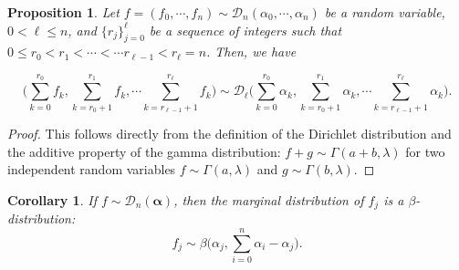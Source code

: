 \documentclass[12pt, a4paper]{amsart}
\theoremstyle{plain}
\newtheorem{prop}[thm]{Proposition}
\newtheorem{cor}[thm]{Corollary}
\theoremstyle{definition}
\numberwithin{figure}{section}
\numberwithin{table}{section}
\numberwithin{equation}{section}
\begin{document}
\begin{prop}%
\label{prop:DirichletReprod}
Let
$
f = (f_0, \cdots, f_n)
	\sim
\mathcal{D}_n(
	\alpha_0, \cdots, \alpha_n
)
$
be a random variable,
$
0 < \ell \le n
$,
and
$
\{ r_j \}_{j=0}^{\ell}
$
be a sequence of integers such that
$
0 \le r_0 < r_1 < \cdots < \cdots r_{\ell -1} < r_{\ell} = n
$.
Then, we have

\begin{equation}
\label{eq::DirichletReprod}
\Big(
	\sum_{k=0}^{r_0}
		f_k,
	\sum_{k=r_0+1}^{r_1}
		f_k,
	\cdots
	\sum_{k=r_{\ell-1}+1}^{r_{\ell}}
		f_k
\Big)
		\sim
\mathcal{D}_{\ell}
\Big(
	\sum_{k=0}^{r_0} 
		\alpha_k,
	\sum_{k=r_0+1}^{r_1}
		\alpha_k,
	\cdots
	\sum_{k=r_{\ell-1}+1}^{r_{\ell}}
		\alpha_k
\Big) .
\end{equation}
\end{prop}
\begin{proof}
This follows directly from the definition of the Dirichlet distribution 
and the additive property of the gamma distribution:
$
f+g \sim \Gamma(a+b, \lambda)
$
for
two independent random variables
$
f \sim \Gamma(a, \lambda)
$
and
$
g \sim \Gamma(b, \lambda)
$.
\end{proof}



\begin{cor}%
\label{cor:marginalDiri}
If
$
f \sim \mathcal{D}_n(
		\boldsymbol{\alpha}
)
$,
then
the marginal distribution of
$f_j$
is a $\beta$-distribution:
\[
f_j
	\sim
\beta\Big(\alpha_j,
	\sum_{i=0}^n \alpha_i
		- \alpha_j
\Big) .
\]
\end{cor}
\end{document}
